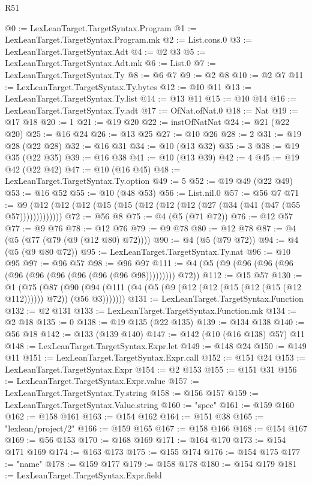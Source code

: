 \begin{lexlean}{R51}
\begin{coremodule}
@0 := LexLeanTarget.TargetSyntax.Program
@1 := LexLeanTarget.TargetSyntax.Program.mk
@2 := List.cons.{0}
@3 := LexLeanTarget.TargetSyntax.Adt
@4 := @2 @3
@5 := LexLeanTarget.TargetSyntax.Adt.mk
@6 := List.{0}
@7 := LexLeanTarget.TargetSyntax.Ty
@8 := @6 @7
@9 := @2 @8
@10 := @2 @7
@11 := LexLeanTarget.TargetSyntax.Ty.bytes
@12 := @10 @11
@13 := LexLeanTarget.TargetSyntax.Ty.list
@14 := @13 @11
@15 := @10 @14
@16 := LexLeanTarget.TargetSyntax.Ty.adt
@17 := OfNat.ofNat.{0}
@18 := Nat
@19 := @17 @18
@20 := 1
@21 := @19 @20
@22 := instOfNatNat
@24 := @21 (@22 @20)
@25 := @16 @24
@26 := @13 @25
@27 := @10 @26
@28 := 2
@31 := @19 @28 (@22 @28)
@32 := @16 @31
@34 := @10 (@13 @32)
@35 := 3
@38 := @19 @35 (@22 @35)
@39 := @16 @38
@41 := @10 (@13 @39)
@42 := 4
@45 := @19 @42 (@22 @42)
@47 := @10 (@16 @45)
@48 := LexLeanTarget.TargetSyntax.Ty.option
@49 := 5
@52 := @19 @49 (@22 @49)
@53 := @16 @52
@55 := @10 (@48 @53)
@56 := List.nil.{0}
@57 := @56 @7
@71 := @9 (@12 (@12 (@12 (@15 (@15 (@12 (@12 (@12 (@27 (@34 (@41 (@47 (@55 @57)))))))))))))
@72 := @56 @8
@75 := @4 (@5 (@71 @72))
@76 := @12 @57
@77 := @9 @76
@78 := @12 @76
@79 := @9 @78
@80 := @12 @78
@87 := @4 (@5 (@77 (@79 (@9 (@12 @80) @72))))
@90 := @4 (@5 (@79 @72))
@94 := @4 (@5 (@9 @80 @72))
@95 := LexLeanTarget.TargetSyntax.Ty.nat
@96 := @10 @95
@97 := @96 @57
@98 := @96 @97
@111 := @4 (@5 (@9 (@96 (@96 (@96 (@96 (@96 (@96 (@96 (@96 (@96 @98))))))))) @72))
@112 := @15 @57
@130 := @1
    (@75
      (@87 (@90 (@94 (@111 (@4 (@5 (@9 (@12 (@12 (@15 (@12 (@15 (@12 @112)))))) @72)) (@56 @3)))))))
@131 := LexLeanTarget.TargetSyntax.Function
@132 := @2 @131
@133 := LexLeanTarget.TargetSyntax.Function.mk
@134 := @2 @18
@135 := 0
@138 := @19 @135 (@22 @135)
@139 := @134 @138
@140 := @56 @18
@142 := @133 (@139 @140)
@147 := @142 (@10 (@16 @138) @57) @11
@148 := LexLeanTarget.TargetSyntax.Expr.let
@149 := @148 @24
@150 := @149 @11
@151 := LexLeanTarget.TargetSyntax.Expr.call
@152 := @151 @24
@153 := LexLeanTarget.TargetSyntax.Expr
@154 := @2 @153
@155 := @151 @31
@156 := LexLeanTarget.TargetSyntax.Expr.value
@157 := LexLeanTarget.TargetSyntax.Ty.string
@158 := @156 @157
@159 := LexLeanTarget.TargetSyntax.Value.string
@160 := "spec"
@161 := @159 @160
@162 := @158 @161
@163 := @154 @162
@164 := @151 @38
@165 := "lexlean/project/2"
@166 := @159 @165
@167 := @158 @166
@168 := @154 @167
@169 := @56 @153
@170 := @168 @169
@171 := @164 @170
@173 := @154 @171 @169
@174 := @163 @173
@175 := @155 @174
@176 := @154 @175
@177 := "name"
@178 := @159 @177
@179 := @158 @178
@180 := @154 @179
@181 := LexLeanTarget.TargetSyntax.Expr.field

\end{coremodule}
\end{lexlean}
